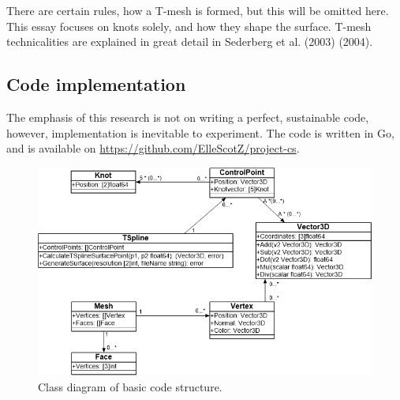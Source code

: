 \documentclass{article}
\begin{document}
There are certain rules, how a T-mesh is formed, but this will be omitted here. This essay focuses on knots solely, and how they shape the surface. T-mesh technicalities are explained in great detail in Sederberg et al. (2003) (2004).

\vspace{12pt}

\begin{large}
\section{Code implementation}
\end{large}

\vspace{12pt}

The emphasis of this research is not on writing a perfect, sustainable code, however, implementation is inevitable to experiment. The code is written in Go, and is available on \url{https://github.com/ElleScotZ/project-cs}.

\begin{figure}[H]
\centering
\includegraphics[width=\textwidth]{CD}
\caption{Class diagram of basic code structure.}
\label{classdiagram}
\end{figure}
\end{document}
